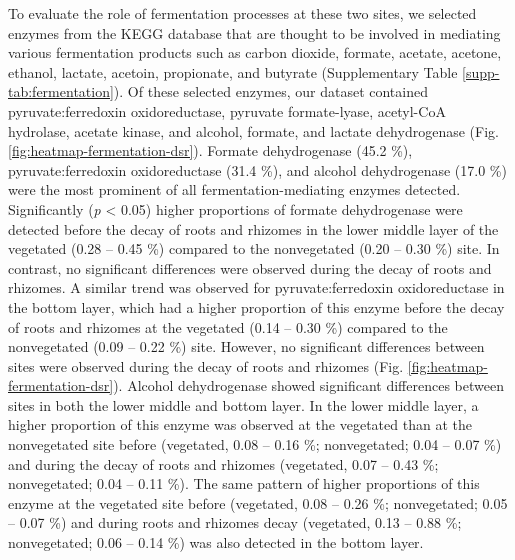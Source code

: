 \documentclass[
  12 pt,
]{article}
\begin{document}
To evaluate the role of fermentation processes at these two sites, we selected enzymes from the KEGG database that are thought to be involved in mediating various fermentation products such as carbon dioxide, formate, acetate, acetone, ethanol, lactate, acetoin, propionate, and butyrate (Supplementary Table \ref{supp-tab:fermentation}). Of these selected enzymes, our dataset contained pyruvate:ferredoxin oxidoreductase, pyruvate formate-lyase, acetyl-CoA hydrolase, acetate kinase, and alcohol, formate, and lactate dehydrogenase (Fig. \ref{fig:heatmap-fermentation-dsr}). Formate dehydrogenase (45.2 \si{\percent}), pyruvate:ferredoxin oxidoreductase (31.4 \si{\percent}), and alcohol dehydrogenase (17.0 \si{\percent}) were the most prominent of all fermentation-mediating enzymes detected. Significantly (\emph{p} \textless{} 0.05) higher proportions of formate dehydrogenase were detected before the decay of roots and rhizomes in the lower middle layer of the vegetated (0.28 -- 0.45 \si{\percent}) compared to the nonvegetated (0.20 -- 0.30 \si{\percent}) site. In contrast, no significant differences were observed during the decay of roots and rhizomes. A similar trend was observed for pyruvate:ferredoxin oxidoreductase in the bottom layer, which had a higher proportion of this enzyme before the decay of roots and rhizomes at the vegetated (0.14 -- 0.30 \si{\percent}) compared to the nonvegetated (0.09 -- 0.22 \si{\percent}) site. However, no significant differences between sites were observed during the decay of roots and rhizomes (Fig. \ref{fig:heatmap-fermentation-dsr}). Alcohol dehydrogenase showed significant differences between sites in both the lower middle and bottom layer. In the lower middle layer, a higher proportion of this enzyme was observed at the vegetated than at the nonvegetated site before (vegetated, 0.08 -- 0.16 \si{\percent}; nonvegetated; 0.04 -- 0.07 \si{\percent}) and during the decay of roots and rhizomes (vegetated, 0.07 -- 0.43 \si{\percent}; nonvegetated; 0.04 -- 0.11 \si{\percent}). The same pattern of higher proportions of this enzyme at the vegetated site before (vegetated, 0.08 -- 0.26 \si{\percent}; nonvegetated; 0.05 -- 0.07 \si{\percent}) and during roots and rhizomes decay (vegetated, 0.13 -- 0.88 \si{\percent}; nonvegetated; 0.06 -- 0.14 \si{\percent}) was also detected in the bottom layer.
\end{document}
